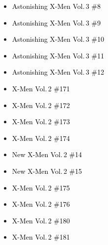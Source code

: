 \documentclass[12pt]{article}
\newcommand{\checkbox}{\raisebox{0.0ex}{\fbox{\rule{0ex}{1.5ex} \rule{1.5ex}{0ex}}}}
\begin{document}
\vspace{0.3cm}
\noindent
\begin{tcolorbox}[
  colback=white!95!gray,
  colframe=black,
  width=\textwidth,
  arc=4mm,
  auto outer arc,
  boxrule=0.8pt,
  left=8pt,right=8pt,top=8pt,bottom=8pt
]
\begin{itemize}[left=0pt,label={\checkbox}]
  \item \textcolor{black}{Astonishing X-Men Vol.\,3 \#8}
  \item \textcolor{black}{Astonishing X-Men Vol.\,3 \#9}
  \item \textcolor{black}{Astonishing X-Men Vol.\,3 \#10}
  \item \textcolor{black}{Astonishing X-Men Vol.\,3 \#11}
  \item \textcolor{black}{Astonishing X-Men Vol.\,3 \#12}
  \item \textcolor{black}{X-Men Vol.\,2 \#171}
  \item \textcolor{black}{X-Men Vol.\,2 \#172}
  \item \textcolor{black}{X-Men Vol.\,2 \#173}
  \item \textcolor{black}{X-Men Vol.\,2 \#174}
  \item \textcolor{black}{New X-Men Vol.\,2 \#14}
  \item \textcolor{black}{New X-Men Vol.\,2 \#15}
  \item \textcolor{black}{X-Men Vol.\,2 \#175}
  \item \textcolor{black}{X-Men Vol.\,2 \#176}
  \item \textcolor{black}{X-Men Vol.\,2 \#180}
  \item \textcolor{black}{X-Men Vol.\,2 \#181}
\end{itemize}
\end{tcolorbox}

\newpage
{}
\end{document}
